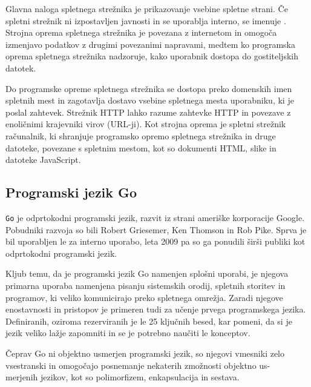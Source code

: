 \documentclass[a4paper, 12pt]{book}
\begin{document}
Glavna naloga spletnega strežnika je prikazovanje vsebine spletne strani. Če spletni strežnik ni izpostavljen javnosti in se uporablja interno, se imenuje . Strojna oprema spletnega strežnika je povezana z internetom in omogoča izmenjavo podatkov z drugimi povezanimi napravami, medtem ko programska oprema spletnega strežnika nadzoruje, kako uporabnik dostopa do gostiteljskih datotek.

Do programske opreme spletnega strežnika se dostopa preko domenskih imen spletnih mest in zagotavlja dostavo vsebine spletnega mesta uporabniku, ki je poslal zahtevek. Strežnik HTTP lahko razume zahtevke HTTP in povezave z enoličnimi krajevniki  virov (URL-ji). Kot strojna oprema je spletni strežnik računalnik, ki shranjuje programsko opremo spletnega strežnika in druge datoteke, povezane s spletnim mestom, kot so dokumenti HTML, slike in datoteke JavaScript.



\subsection{Programski jezik Go}

\verb=Go= je odprtokodni programski jezik, razvit iz strani ameriške korporacije Google. Pobudniki razvoja so bili Robert Griesemer, Ken Thomson in Rob Pike. Sprva je bil uporabljen le za interno uporabo, leta 2009 pa so ga ponudili širši publiki kot odprtokodni programski jezik.

Kljub temu, da je programski jezik Go namenjen splošni uporabi, je njegova primarna uporaba namenjena pisanju sistemskih orodij, spletnih storitev in programov, ki veliko komunicirajo preko  spletnega omrežja. Zaradi njegove enostavnosti in pristopov je primeren tudi za učenje prvega programskega jezika. Definiranih, oziroma rezerviranih je le 25 ključnih besed, kar pomeni, da si je jezik veliko lažje zapomniti in se je potrebno naučiti le konceptov.

Čeprav Go ni objektno usmerjen programski jezik, so njegovi vmesniki zelo vsestranski in omogočajo posnemanje nekaterih zmožnosti objektno us-\\merjenih jezikov, kot so polimorfizem, enkapsulacija in sestava.
\end{document}
